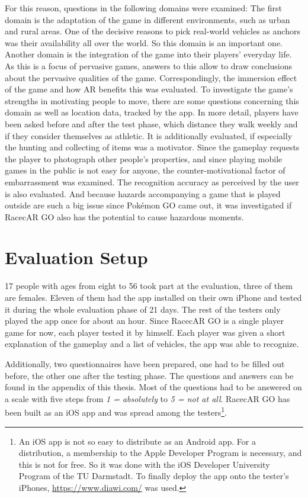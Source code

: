 For this reason, questions in the following domains were examined: The first domain is the adaptation of the game in different environments, such as urban and rural areas. One of the decisive reasons to pick real-world vehicles as anchors was their availability all over the world. So this domain is an important one. Another domain is the integration of the game into their players' everyday life. As this is a focus of pervasive games, answers to this allow to draw conclusions about the pervasive qualities of the game. Correspondingly, the immersion effect of the game and how AR benefits this was evaluated. To investigate the game's strengths in motivating people to move, there are some questions concerning this domain as well as location data, tracked by the app. In more detail, players have been asked before and after the test phase, which distance they walk weekly and if they consider themselves as athletic. It is additionally evaluated, if especially the hunting and collecting of items was a motivator. Since the gameplay requests the player to photograph other people's properties, and since playing mobile games in the public is not easy for anyone, the counter-motivational factor of embarrassment was examined. The recognition accuracy as perceived by the user is also evaluated. And because hazards accompanying a game that is played outside are such a big issue since Pok\'{e}mon GO came out, it was investigated if RacecAR GO also has the potential to cause hazardous moments.

\section{Evaluation Setup}
17 people with ages from eight to 56 took part at the evaluation, three of them are females. Eleven of them had the app installed on their own iPhone and tested it during the whole evaluation phase of 21 days. The rest of the testers only played the app once for about an hour. Since RacecAR GO is a single player game for now, each player tested it by himself. Each player was given a short explanation of the gameplay and a list of vehicles, the app was able to recognize.

Additionally, two questionnaires have been prepared, one had to be filled out before, the other one after the testing phase. The questions and answers can be found in the appendix of this thesis. Most of the questions had to be answered on a scale with five steps from \emph{1 = absolutely} to \emph{5 = not at all}. RacecAR GO has been built as an iOS app and was spread among the testers\footnote{An iOS app is not so easy to distribute as an Android app. For a distribution, a membership to the Apple Developer Program is necessary, and this is not for free. So it was done with the iOS Developer University Program of the TU Darmstadt. To finally deploy the app onto the tester's iPhones, \url{https://www.diawi.com/} was used.}.

